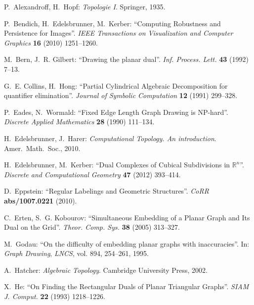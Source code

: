 \documentclass[12pt]{article}
\begin{document}
\begin{thebibliography}{10}
\newcommand{\enquote}[1]{``#1''}
\providecommand{\url}[1]{\texttt{#1}}
\providecommand{\urlprefix}{URL }

P.~Alexandroff, H.~Hopf: \emph{Topologie I}.
\newblock Springer, 1935.

P.~Bendich, H.~Edelsbrunner, M.~Kerber: \enquote{Computing Robustness and
  Persistence for Images}.
\newblock \emph{IEEE Transactions on Visualization and Computer Graphics}
  \textbf{16} (2010) 1251--1260.

M.~Bern, J.~R. Gilbert: \enquote{Drawing the planar dual}.
\newblock \emph{Inf. Process. Lett.} \textbf{43} (1992) 7--13.

G.~E. Collins, H.~Hong: \enquote{Partial Cylindrical Algebraic Decomposition
  for quantifier elimination}.
\newblock \emph{Journal of Symbolic Computation} \textbf{12} (1991) 299--328.

P.~Eades, N.~Wormald: \enquote{Fixed Edge Length Graph Drawing is NP-hard}.
\newblock \emph{Discrete Applied Mathematics} \textbf{28} (1990) 111--134.

H.~Edelsbrunner, J.~Harer: \emph{Computational Topology. An introduction}.
\newblock Amer.\ Math.\ Soc., 2010.

H.~Edelsbrunner, M.~Kerber: \enquote{Dual Complexes of Cubical Subdivisions in
  $\mathbb{R}^n$}.
\newblock \emph{Discrete and Computational Geometry} \textbf{47} (2012)
  393--414.

D.~Eppstein: \enquote{Regular Labelings and Geometric Structures}.
\newblock \emph{CoRR} \textbf{abs/1007.0221} (2010).

C.~Erten, S.~G. Kobourov: \enquote{Simultaneous Embedding of a Planar Graph and
  Its Dual on the Grid}.
\newblock \emph{Theor. Comp. Sys.} \textbf{38} (2005) 313--327.

M.~Godau: \enquote{On the difficulty of embedding planar graphs with
  inaccuracies}.
\newblock In: \emph{Graph Drawing}, \emph{LNCS}, vol. 894, 254--261, 1995.

A.~Hatcher: \emph{Algebraic Topology}.
\newblock Cambridge University Press, 2002.

X.~He: \enquote{On Finding the Rectangular Duals of Planar Triangular Graphs}.
\newblock \emph{SIAM J. Comput.} \textbf{22} (1993) 1218--1226.


\end{thebibliography}
\end{document}
